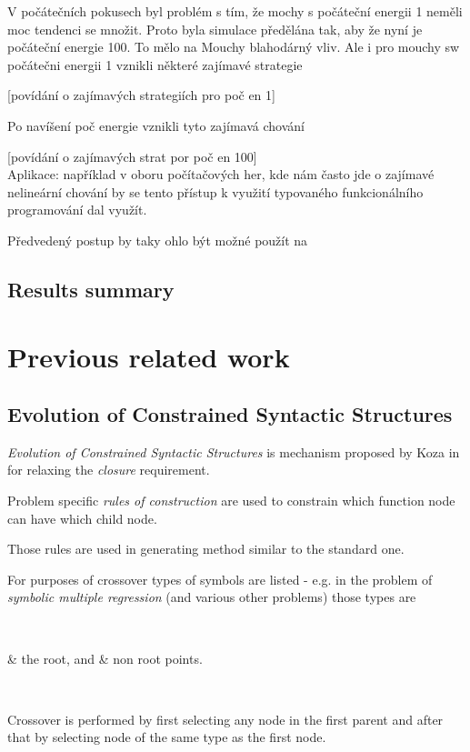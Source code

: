 \documentclass[12pt,a4paper]{report}
\begin{document}
V počátečních pokusech byl problém s tím, že mochy s počáteční energii 1
neměli moc tendenci se množit. Proto byla simulace předělána tak, aby
že nyní je počáteční energie 100. To mělo na Mouchy blahodárný vliv.
Ale i pro mouchy sw počátečni energii 1 vznikli některé zajímavé strategie

[povídání o zajímavých strategiích pro poč en 1]

Po navíšení poč energie vznikli tyto zajímavá chování

[povídání o zajímavých strat por poč en 100]\\

Aplikace: například v oboru počítačových her, kde nám často jde o
zajímavé nelineární chování by se tento přístup k využití typovaného funkcionálního
programování dal využít.

Předvedený postup by taky ohlo být možné použít na 



\section{Results summary}


		
\chapter{Previous related work}

\section{Evolution of Constrained Syntactic Structures }
\textit{Evolution of Constrained Syntactic Structures}
is mechanism proposed by Koza in \cite{koza92} for relaxing 
the \textit{closure} requirement.

Problem specific \textit{rules of construction}
are used to constrain which function node
can have which child node.

Those rules are used in generating method similar to the standard one.

For purposes of crossover types of symbols are listed - 
e.g. in the problem of \textit{symbolic multiple regression} 
(and various other problems)
those types are 

~\begin{easylist}[itemize]
& the root, and
& non root points.
\end{easylist}~

Crossover is performed by first selecting any node in the first
parent and after that by selecting node of the same type as the first node.\\
\end{document}
